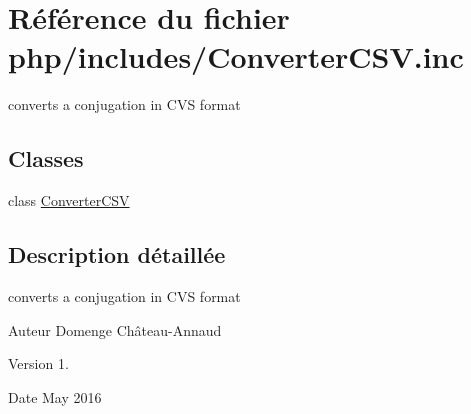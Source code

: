 \hypertarget{_converter_c_s_v_8inc}{}\section{Référence du fichier php/includes/\+Converter\+C\+SV.inc}
\label{_converter_c_s_v_8inc}


converts a conjugation in C\+VS format  


\subsection*{Classes}
\begin{DoxyCompactItemize}
\item 
class \hyperlink{class_converter_c_s_v}{Converter\+C\+SV}
\end{DoxyCompactItemize}


\subsection{Description détaillée}
converts a conjugation in C\+VS format 

\begin{DoxyAuthor}{Auteur}
Domenge Château-\/\+Annaud 
\end{DoxyAuthor}
\begin{DoxyVersion}{Version}
1. 
\end{DoxyVersion}
\begin{DoxyDate}{Date}
May 2016 
\end{DoxyDate}

